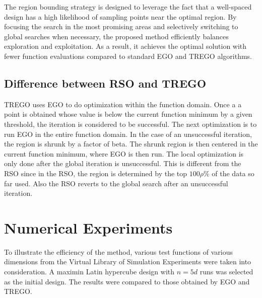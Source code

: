 \documentclass [PhD] {package/uclathes}
\begin{document}
The region bounding strategy is designed to leverage the fact that a well-spaced design has a high likelihood of sampling points near the optimal region. By focusing the search in the most promising areas and selectively switching to global searches when necessary, the proposed method efficiently balances exploration and exploitation. As a result, it achieves the optimal solution with fewer function evaluations compared to standard EGO and TREGO algorithms.

\subsection{Difference between RSO and TREGO}
TREGO uses EGO to do optimization within the function domain. Once a a point is obtained whose value is below the current function minimum by a given threshold, the iteration is considered to be successful. The next optimization is to run EGO  in the entire function domain. In the case of an unsuccessful iteration, the region is shrunk by a factor of beta. The shrunk region is then centered in the current function minimum, where EGO is then run. The local optimization is only done after the global iteration is unsuccessful. This is different from the RSO since in the RSO, the region is determined by the top $100\rho\%$ of the data so far used. Also the RSO reverts to the global search after an unsuccessful iteration.


\section{Numerical Experiments}
To illustrate the efficiency of the method, various test functions of various dimensions from the Virtual Library of Simulation Experiments \parencite{simulationlib} were taken into consideration. A maximin Latin hypercube design with $n=5d$ runs was selected as the initial design. The results were compared to those obtained by EGO and TREGO.
\end{document}

